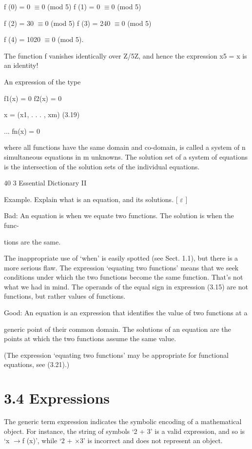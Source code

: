 \documentclass[11pt]{article}
\theoremstyle{plain}
\theoremstyle{definition}
\begin{document}
f (0) = 0 $\equiv$0 (mod 5) f (1) = 0 $\equiv$0 (mod 5)

f (2) = 30 $\equiv$0 (mod 5) f (3) = 240 $\equiv$0 (mod 5)

f (4) = 1020 $\equiv$0 (mod 5).

The function f vanishes identically over Z/5Z, and hence the expression x5 = x is an identity!

An expression of the type

 

f1(x) = 0 f2(x) = 0

x = (x1, . . . , xm) (3.19)

... fn(x) = 0



where all functions have the same domain and co-domain, is called a system of n simultaneous equations in m unknowns. The solution set of a system of equations is the intersection of the solution sets of the individual equations.

40 3 Essential Dictionary II

Example. Explain what is an equation, and its solutions. [ $\varepsilon$ ]

Bad: An equation is when we equate two functions. The solution is when the func-

tions are the same.

The inappropriate use of `when' is easily spotted (see Sect. 1.1), but there is a more serious flaw. The expression `equating two functions' means that we seek conditions under which the two functions become the same function. That's not what we had in mind. The operands of the equal sign in expression (3.15) are not functions, but rather values of functions.

Good: An equation is an expression that identifies the value of two functions at a

generic point of their common domain. The solutions of an equation are the points at which the two functions assume the same value.

(The expression `equating two functions' may be appropriate for functional equations, see (3.21).)

\section{3.4 Expressions}

The generic term expression indicates the symbolic encoding of a mathematical object. For instance, the string of symbols `2 + 3' is a valid expression, and so is `x $\to$f (x)', while `2 + $\times$3' is incorrect and does not represent an object.
\end{document}
